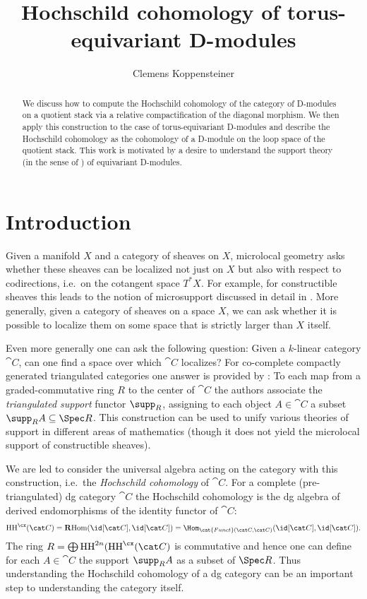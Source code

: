 \documentclass[english]{ck-article}
\title{Hochschild cohomology of torus-equivariant D-modules}
\author{Clemens Koppensteiner}
\newcommand{\HCoh}{\operatorname{HH}^\cx}
\newcommand\ΓdR{Γ_{\mkern-4mu\dR}}
\newcommand\Γsub[1]{\Gamma_{\mkern-3mu#1}}
\begin{document}
\maketitle

\begin{abstract}
    We discuss how to compute the Hochschild cohomology of the category of D-modules on a quotient stack via a relative compactification of the diagonal morphism.
    We then apply this construction to the case of torus-equivariant D-modules and describe the Hochschild cohomology as the cohomology of a D-module on the loop space of the quotient stack.
    This work is motivated by a desire to understand the support theory (in the sense of \cite{BensonIyengarKrause:2008:LocalCohomologyAndSupportForTriangulatedCategories}) of equivariant D-modules.
\end{abstract}

\section{Introduction}

Given a manifold $X$ and a category of sheaves on $X$, microlocal geometry asks whether these sheaves can be localized not just on $X$ but also with respect to codirections, i.e.~on the cotangent space $T^*X$.
For example, for constructible sheaves this leads to the notion of microsupport discussed in detail in \cite{KashiwaraSchapira:1994:SheavesOnManifolds}.
More generally, given a category of sheaves on a space $X$, we can ask whether it is possible to localize them on some space that is strictly larger than $X$ itself.

Even more generally one can ask the following question: Given a $k$-linear category $\cat C$, can one find a space over which $\cat C$ localizes?
For co-complete compactly generated triangulated categories one answer is provided by \cite{BensonIyengarKrause:2008:LocalCohomologyAndSupportForTriangulatedCategories}:
To each map from a graded-commutative ring $R$ to the center of $\cat C$ the authors associate the \emph{triangulated support} functor $\supp_R$, assigning to each object $A ∈ \cat C$ a subset $\supp_R A \subseteq \Spec R$.
This construction can be used to unify various theories of support in different areas of mathematics (though it does not yield the microlocal support of constructible sheaves).

We are led to consider the universal algebra acting on the category with this construction, i.e.~the \emph{Hochschild cohomology} of $\cat C$.
For a complete (pre-triangulated) dg category $\cat C$ the Hochschild cohomology is the dg algebra of derived endomorphisms of the identity functor of $\cat C$:
\[
    \HCoh(\cat C)
    = \operatorname{\mathbf{R}Hom}(\id[\cat C], \id[\cat C])
    = \Hom_{\cat{Funct}(\cat C, \cat C)}(\id[\cat C], \id[\cat C]).
\]
The ring $R = \bigoplus \operatorname{HH}^{2n}(\HCoh(\cat C)$ is commutative and hence one can define for each $A ∈ \cat C$ the support $\supp_R A$ as a subset of $\Spec R$.
Thus understanding the Hochschild cohomology of a dg category can be an important step to understanding the category itself.
\end{document}
